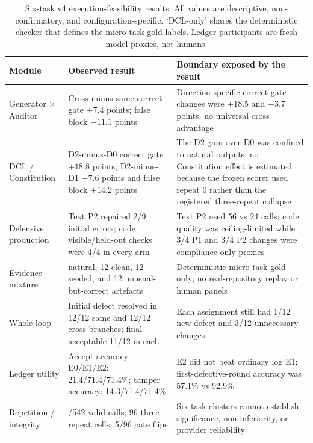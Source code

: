 \documentclass[11pt,letterpaper]{article}
\begin{document}
\begin{table}[h]
\centering\footnotesize\setlength{\tabcolsep}{3pt}
\caption{Six-task v4 execution-feasibility results. All values are descriptive, non-confirmatory, and configuration-specific. `DCL-only' shares the deterministic checker that defines the micro-task gold labels. Ledger participants are fresh model proxies, not humans.}
\label{tab:v4feasibility}
\begin{tabular}{@{}>{\raggedright\arraybackslash}p{27mm}>{\raggedright\arraybackslash}p{55mm}>{\raggedright\arraybackslash}p{62mm}@{}}
\toprule
Module & Observed result & Boundary exposed by the result \\
\midrule
Generator $\times$ Auditor & Cross-minus-same correct gate $+7.4$ points; false block $-11.1$ points & Direction-specific correct-gate changes were $+18.5$ and $-3.7$ points; no universal cross advantage \\
DCL / Constitution & D2-minus-D0 correct gate $+18.8$ points; D2-minus-D1 $-7.6$ points and false block $+14.2$ points & The D2 gain over D0 was confined to natural outputs; no Constitution effect is estimated because the frozen scorer used repeat 0 rather than the registered three-repeat collapse \\
Defensive production & Text P2 repaired 2/9 initial errors; code visible/held-out checks were 4/4 in every arm & Text P2 used 56 vs 24 calls; code quality was ceiling-limited while 3/4 P1 and 3/4 P2 changes were compliance-only proxies \\
Evidence mixture & 12 natural, 12 clean, 12 seeded, and 12 unusual-but-correct artefacts & Deterministic micro-task gold only; no real-repository replay or human panels \\
Whole loop & Initial defect resolved in 12/12 same and 12/12 cross branches; final acceptable 11/12 in each & Each assignment still had 1/12 new defect and 3/12 unnecessary changes \\
Ledger utility & Accept accuracy E0/E1/E2: 21.4/71.4/71.4\%; tamper accuracy: 14.3/71.4/71.4\% & E2 did not beat ordinary log E1; first-defective-round accuracy was 57.1\% vs 92.9\% \\
Repetition / integrity & 542/542 valid calls; 96 three-repeat cells; 5/96 gate flips & Six task clusters cannot establish significance, non-inferiority, or provider reliability \\
\bottomrule
\end{tabular}
\end{table}
\end{document}
